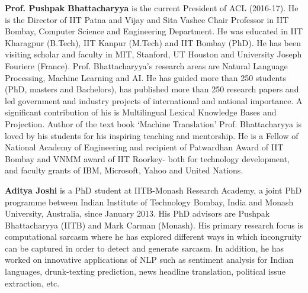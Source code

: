 \begin{bio}
\textbf{Prof. Pushpak Bhattacharyya} is the current President of ACL (2016-17). He is the Director of IIT Patna and Vijay and Sita Vashee Chair Professor in IIT Bombay, Computer Science and Engineering Department. He was educated in IIT Kharagpur (B.Tech), IIT Kanpur (M.Tech) and IIT Bombay (PhD). He has been visiting scholar and faculty in MIT, Stanford, UT Houston and University Joseph Fouriere (France). Prof. Bhattacharyya’s research areas are Natural Language Processing, Machine Learning and AI. He has guided more than 250 students (PhD, masters and Bachelors), has published more than 250 research papers and led government and industry projects of international and national importance. A significant contribution of his is Multilingual Lexical Knowledge Bases and Projection. Author of the text book ‘Machine Translation’ Prof. Bhattacharyya is loved by his students for his inspiring teaching and mentorship. He is a Fellow of National Academy of Engineering and recipient of Patwardhan Award of IIT Bombay and VNMM award of IIT Roorkey- both for technology development, and faculty grants of IBM, Microsoft, Yahoo and United Nations.

\textbf{Aditya Joshi} is a PhD student at IITB-Monash Research Academy, a joint PhD programme between Indian Institute of Technology Bombay, India and Monash University, Australia, since January 2013. His PhD advisors are Pushpak Bhattacharyya (IITB) and Mark Carman (Monash). His primary research focus is computational sarcasm where he has explored different ways in which incongruity can be captured in order to detect and generate sarcasm. In addition, he has worked on innovative applications of NLP such as sentiment analysis for Indian languages, drunk-texting prediction, news headline translation, political issue extraction, etc.
\end{bio}

